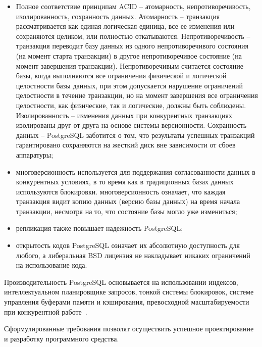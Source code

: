\begin{itemize}
	\item Полное соответствие принципам ACID -- атомарность, непротиворечивость, изолированность, сохранность данных.
	Атомарность -- транзакция рассматривается как единая логическая единица, все ее изменения или сохраняются целиком,
	или полностью откатываются. Непротиворечивость -- транзакция переводит базу данных из одного непротиворечивого
	состояния (на момент старта транзакции) в другое непротиворечивое состояние (на момент завершения транзакции).
	Непротиворечивым считается состояние базы, когда выполняются все ограничения физической и логической целостности
	базы данных, при этом допускается нарушение ограничений целостности в течение транзакции, но на момент завершения все
	ограничения целостности, как физические, так и логические, должны быть соблюдены. Изолированность -- изменения данных
	при конкурентных транзакциях изолированы друг от друга на основе системы версионности.
	Сохранность данных -- PostgreSQL заботится о том, что результаты успешных транзакций гарантировано сохраняются на
	жесткий диск вне зависимости от сбоев аппаратуры;
	\item многоверсионность используется для поддержания согласованности данных в конкурентных условиях, в то время как в
	традиционных базах данных используются блокировки. многоверсионность означает, что каждая транзакция видит копию
	данных (версию базы данных) на время начала транзакции, несмотря на то, что состояние базы могло уже измениться;
	\item репликация также повышает надежность PostgreSQL;
	\item открытость кодов PostgreSQL означает их абсолютную доступность для любого, а либеральная BSD лицензия не
	накладывает никаких ограничений на использование кода.
\end{itemize}

Производительность PostgreSQL основывается на использовании индексов, интеллектуальном планировщике запросов,
тонкой системы блокировок, системе управления буферами памяти и кэширования, превосходной масштабируемости при
конкурентной работе~\cite{postgres}.

Сформулированные требования позволят осуществить успешное проектирование и разработку программного средства.
